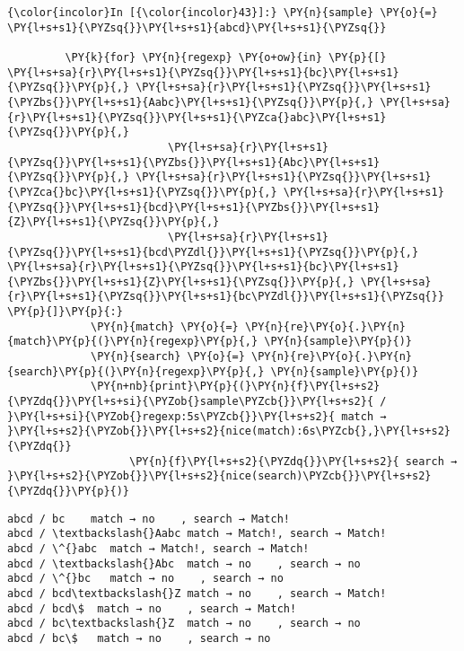     \begin{Verbatim}[commandchars=\\\{\},frame=single,framerule=0.3mm,rulecolor=\color{cellframecolor}]
{\color{incolor}In [{\color{incolor}43}]:} \PY{n}{sample} \PY{o}{=} \PY{l+s+s1}{\PYZsq{}}\PY{l+s+s1}{abcd}\PY{l+s+s1}{\PYZsq{}}
         
         \PY{k}{for} \PY{n}{regexp} \PY{o+ow}{in} \PY{p}{[} \PY{l+s+sa}{r}\PY{l+s+s1}{\PYZsq{}}\PY{l+s+s1}{bc}\PY{l+s+s1}{\PYZsq{}}\PY{p}{,} \PY{l+s+sa}{r}\PY{l+s+s1}{\PYZsq{}}\PY{l+s+s1}{\PYZbs{}}\PY{l+s+s1}{Aabc}\PY{l+s+s1}{\PYZsq{}}\PY{p}{,} \PY{l+s+sa}{r}\PY{l+s+s1}{\PYZsq{}}\PY{l+s+s1}{\PYZca{}abc}\PY{l+s+s1}{\PYZsq{}}\PY{p}{,} 
                         \PY{l+s+sa}{r}\PY{l+s+s1}{\PYZsq{}}\PY{l+s+s1}{\PYZbs{}}\PY{l+s+s1}{Abc}\PY{l+s+s1}{\PYZsq{}}\PY{p}{,} \PY{l+s+sa}{r}\PY{l+s+s1}{\PYZsq{}}\PY{l+s+s1}{\PYZca{}bc}\PY{l+s+s1}{\PYZsq{}}\PY{p}{,} \PY{l+s+sa}{r}\PY{l+s+s1}{\PYZsq{}}\PY{l+s+s1}{bcd}\PY{l+s+s1}{\PYZbs{}}\PY{l+s+s1}{Z}\PY{l+s+s1}{\PYZsq{}}\PY{p}{,} 
                         \PY{l+s+sa}{r}\PY{l+s+s1}{\PYZsq{}}\PY{l+s+s1}{bcd\PYZdl{}}\PY{l+s+s1}{\PYZsq{}}\PY{p}{,} \PY{l+s+sa}{r}\PY{l+s+s1}{\PYZsq{}}\PY{l+s+s1}{bc}\PY{l+s+s1}{\PYZbs{}}\PY{l+s+s1}{Z}\PY{l+s+s1}{\PYZsq{}}\PY{p}{,} \PY{l+s+sa}{r}\PY{l+s+s1}{\PYZsq{}}\PY{l+s+s1}{bc\PYZdl{}}\PY{l+s+s1}{\PYZsq{}} \PY{p}{]}\PY{p}{:}
             \PY{n}{match} \PY{o}{=} \PY{n}{re}\PY{o}{.}\PY{n}{match}\PY{p}{(}\PY{n}{regexp}\PY{p}{,} \PY{n}{sample}\PY{p}{)}
             \PY{n}{search} \PY{o}{=} \PY{n}{re}\PY{o}{.}\PY{n}{search}\PY{p}{(}\PY{n}{regexp}\PY{p}{,} \PY{n}{sample}\PY{p}{)}
             \PY{n+nb}{print}\PY{p}{(}\PY{n}{f}\PY{l+s+s2}{\PYZdq{}}\PY{l+s+si}{\PYZob{}sample\PYZcb{}}\PY{l+s+s2}{ / }\PY{l+s+si}{\PYZob{}regexp:5s\PYZcb{}}\PY{l+s+s2}{ match → }\PY{l+s+s2}{\PYZob{}}\PY{l+s+s2}{nice(match):6s\PYZcb{},}\PY{l+s+s2}{\PYZdq{}}
                   \PY{n}{f}\PY{l+s+s2}{\PYZdq{}}\PY{l+s+s2}{ search → }\PY{l+s+s2}{\PYZob{}}\PY{l+s+s2}{nice(search)\PYZcb{}}\PY{l+s+s2}{\PYZdq{}}\PY{p}{)}
\end{Verbatim}


    \begin{Verbatim}[commandchars=\\\{\},frame=single,framerule=0.3mm,rulecolor=\color{cellframecolor}]
abcd / bc    match → no    , search → Match!
abcd / \textbackslash{}Aabc match → Match!, search → Match!
abcd / \^{}abc  match → Match!, search → Match!
abcd / \textbackslash{}Abc  match → no    , search → no
abcd / \^{}bc   match → no    , search → no
abcd / bcd\textbackslash{}Z match → no    , search → Match!
abcd / bcd\$  match → no    , search → Match!
abcd / bc\textbackslash{}Z  match → no    , search → no
abcd / bc\$   match → no    , search → no
\end{Verbatim}

